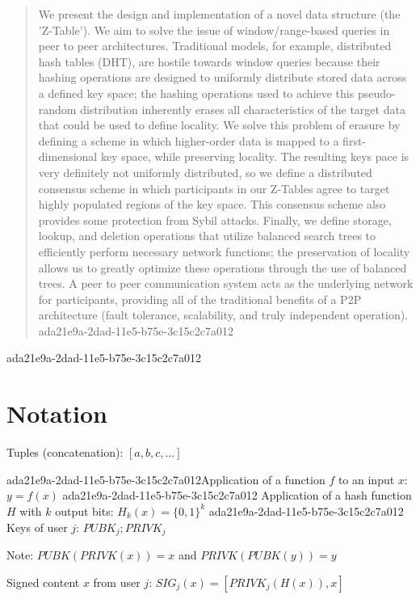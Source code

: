 \documentclass[12pt]{article}
\begin{document}
\maketitle

\begin{abstract}
We present the design and implementation of a novel data structure (the 'Z-Table'). We aim to solve the issue of window/range-based queries in peer to peer architectures. Traditional models, for example,  distributed hash tables (DHT), are hostile towards window queries because their hashing operations are designed to uniformly distribute stored data across a defined key space; the hashing operations used to achieve this pseudo-random distribution inherently erases all characteristics of the target data that could be used to define locality. We solve this problem of erasure by defining a scheme in which higher-order data is mapped to a first-dimensional key space, while preserving locality. The resulting keys pace is very definitely not uniformly distributed, so we define a distributed consensus scheme in which participants in our Z-Tables agree to target highly populated regions of the key space. This consensus scheme also provides some protection from Sybil attacks. Finally, we define storage, lookup, and deletion operations that utilize balanced search trees to efficiently perform necessary network functions; the preservation of locality allows us to greatly optimize these operations through the use of balanced trees. A peer to peer communication system acts as the underlying network for participants, providing all of the traditional benefits of a P2P architecture (fault tolerance, scalability, and truly independent operation).
ada21e9a-2dad-11e5-b75e-3c15c2c7a012\end{abstract}
ada21e9a-2dad-11e5-b75e-3c15c2c7a012
\section{Notation}

Tuples (concatenation): $[a,b,c,...]$

ada21e9a-2dad-11e5-b75e-3c15c2c7a012Application of a function $f$ to an input $x$: $y=f(x)$
ada21e9a-2dad-11e5-b75e-3c15c2c7a012
Application of a hash function $H$ with $k$ output bits: $H_{k}(x) = \{0,1\}^k$
ada21e9a-2dad-11e5-b75e-3c15c2c7a012
Keys of user $j$: $ PUBK_j; PRIVK_j $

Note: $PUBK(PRIVK(x)) = x$ and $PRIVK(PUBK(y)) = y$~

Signed content $x$ from user $j$: $SIG_j(x) = \left[ PRIVK_j( H(x) ), x \right]$
\end{document}
